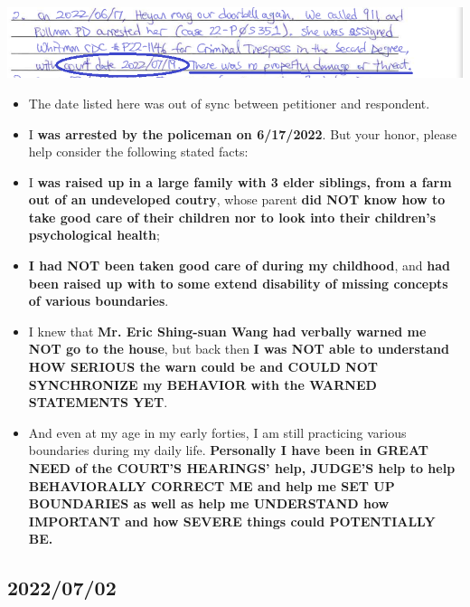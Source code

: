\documentclass[9pt, b5paper]{article}
\begin{document}
\includegraphics[width=.9\linewidth]{./pic/dearCousin_20220920_142737.png}
\begin{itemize}
\item The date listed here was out of sync between petitioner and respondent.
\item I \textbf{was arrested by the policeman on 6/17/2022}. But your honor, please help consider the following stated facts:
\item I \textbf{was raised up in a large family with 3 elder siblings, from a farm out of an undeveloped coutry}, whose parent \textbf{did NOT know how to take good care of their children nor to look into their children's psychological health};
\item \textbf{I had NOT been taken good care of during my childhood}, and \textbf{had been raised up with to some extend disability of missing concepts of various boundaries}.
\item I knew that \textbf{Mr. Eric Shing-suan Wang had verbally warned me NOT go to the house}, but back then \textbf{I was NOT able to understand HOW SERIOUS the warn could be and COULD NOT SYNCHRONIZE my BEHAVIOR with the WARNED STATEMENTS YET}.
\item And even at my age in my early forties, I am still practicing various boundaries during my daily life. \textbf{Personally I have been in GREAT NEED of the COURT'S HEARINGS' help, JUDGE'S help to help BEHAVIORALLY CORRECT ME and help me SET UP BOUNDARIES as well as help me UNDERSTAND how IMPORTANT and how SEVERE things could POTENTIALLY BE.}
\end{itemize}
\subsection{2022/07/02}
\label{sec-4-3}
\end{document}
